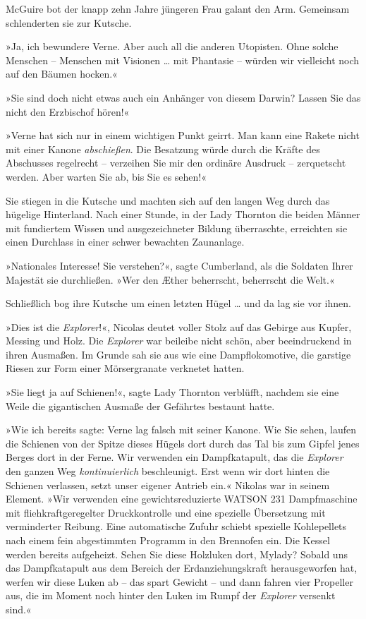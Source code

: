 McGuire bot der knapp zehn Jahre jüngeren Frau galant den Arm.
Gemeinsam schlenderten sie zur Kutsche.

»Ja, ich bewundere Verne. Aber auch all die anderen Utopisten. Ohne
solche Menschen – Menschen mit Visionen … mit Phantasie – würden
wir vielleicht noch auf den Bäumen hocken.«

»Sie sind doch nicht etwas auch ein Anhänger von diesem Darwin?
Lassen Sie das nicht den Erzbischof hören!«

»Verne hat sich nur in einem wichtigen Punkt geirrt. Man kann eine
Rakete nicht mit einer Kanone \emph{abschießen}. Die Besatzung
würde durch die Kräfte des Abschusses regelrecht – verzeihen Sie
mir den ordinäre Ausdruck – zerquetscht werden. Aber warten Sie ab,
bis Sie es sehen!«

Sie stiegen in die Kutsche und machten sich auf den langen Weg
durch das hügelige Hinterland. Nach einer Stunde, in der Lady
Thornton die beiden Männer mit fundiertem Wissen und
ausgezeichneter Bildung überraschte, erreichten sie einen Durchlass
in einer schwer bewachten Zaunanlage.

»Nationales Interesse! Sie verstehen?«, sagte Cumberland, als die
Soldaten Ihrer Majestät sie durchließen. »Wer den Æther beherrscht,
beherrscht die Welt.«

Schließlich bog ihre Kutsche um einen letzten Hügel … und da lag
sie vor ihnen.

»Dies ist die \emph{Explorer}!«, Nicolas deutet voller Stolz auf
das Gebirge aus Kupfer, Messing und Holz. Die \emph{Explorer} war
beileibe nicht schön, aber beeindruckend in ihren Ausmaßen. Im
Grunde sah sie aus wie eine Dampflokomotive, die garstige Riesen
zur Form einer Mörsergranate verknetet hatten.

»Sie liegt ja auf Schienen!«, sagte Lady Thornton verblüfft,
nachdem sie eine Weile die gigantischen Ausmaße der Gefährtes
bestaunt hatte.

»Wie ich bereits sagte: Verne lag falsch mit seiner Kanone. Wie Sie
sehen, laufen die Schienen von der Spitze dieses Hügels dort durch
das Tal bis zum Gipfel jenes Berges dort in der Ferne. Wir
verwenden ein Dampfkatapult, das die \emph{Explorer} den ganzen Weg
\emph{kontinuierlich} beschleunigt. Erst wenn wir dort hinten die
Schienen verlassen, setzt unser eigener Antrieb ein.« Nikolas war
in seinem Element. »Wir verwenden eine gewichtsreduzierte WATSON
231 Dampfmaschine mit fliehkraftgeregelter Druckkontrolle und eine
spezielle Übersetzung mit verminderter Reibung. Eine automatische
Zufuhr schiebt spezielle Kohlepellets nach einem fein abgestimmten
Programm in den Brennofen ein. Die Kessel werden bereits
aufgeheizt. Sehen Sie diese Holzluken dort, Mylady? Sobald uns das
Dampfkatapult aus dem Bereich der Erdanziehungskraft herausgeworfen
hat, werfen wir diese Luken ab – das spart Gewicht – und dann
fahren vier Propeller aus, die im Moment noch hinter den Luken im
Rumpf der \emph{Explorer} versenkt sind.«

